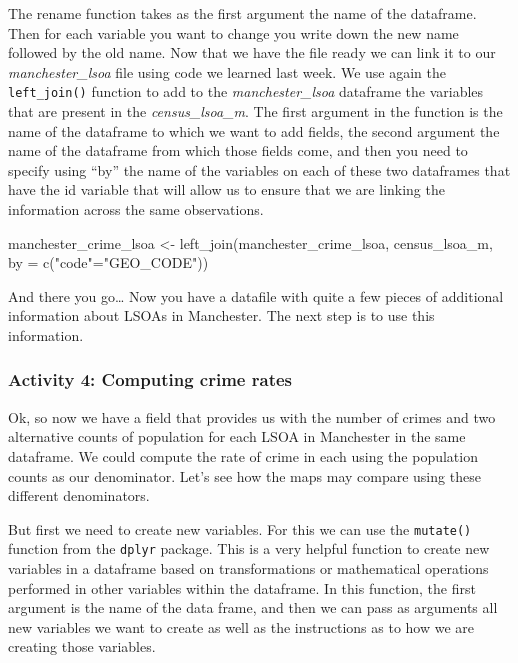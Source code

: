 \documentclass[
]{book}
\newenvironment{Shaded}{\begin{snugshade}}{\end{snugshade}}
\newcommand{\AttributeTok}[1]{\textcolor[rgb]{0.77,0.63,0.00}{#1}}
\newcommand{\FunctionTok}[1]{\textcolor[rgb]{0.00,0.00,0.00}{#1}}
\newcommand{\NormalTok}[1]{#1}
\newcommand{\OtherTok}[1]{\textcolor[rgb]{0.56,0.35,0.01}{#1}}
\newcommand{\StringTok}[1]{\textcolor[rgb]{0.31,0.60,0.02}{#1}}
\begin{document}
The rename function takes as the first argument the name of the dataframe. Then for each variable you want to change you write down the new name followed by the old name. Now that we have the file ready we can link it to our \emph{manchester\_lsoa} file using code we learned last week. We use again the \texttt{left\_join()} function to add to the \emph{manchester\_lsoa} dataframe the variables that are present in the \emph{census\_lsoa\_m}. The first argument in the function is the name of the dataframe to which we want to add fields, the second argument the name of the dataframe from which those fields come, and then you need to specify using ``by'' the name of the variables on each of these two dataframes that have the id variable that will allow us to ensure that we are linking the information across the same observations.

\begin{Shaded}
\begin{Highlighting}[]
\NormalTok{manchester\_crime\_lsoa }\OtherTok{\textless{}{-}} \FunctionTok{left\_join}\NormalTok{(manchester\_crime\_lsoa, census\_lsoa\_m, }\AttributeTok{by =} \FunctionTok{c}\NormalTok{(}\StringTok{"code"}\OtherTok{=}\StringTok{"GEO\_CODE"}\NormalTok{))}
\end{Highlighting}
\end{Shaded}

And there you go\ldots{} Now you have a datafile with quite a few pieces of additional information about LSOAs in Manchester. The next step is to use this information.

\hypertarget{activity-4-computing-crime-rates}{%
\subsubsection{Activity 4: Computing crime rates}\label{activity-4-computing-crime-rates}}

Ok, so now we have a field that provides us with the number of crimes and two alternative counts of population for each LSOA in Manchester in the same dataframe. We could compute the rate of crime in each using the population counts as our denominator. Let's see how the maps may compare using these different denominators.

But first we need to create new variables. For this we can use the \texttt{mutate()} function from the \texttt{dplyr} package. This is a very helpful function to create new variables in a dataframe based on transformations or mathematical operations performed in other variables within the dataframe. In this function, the first argument is the name of the data frame, and then we can pass as arguments all new variables we want to create as well as the instructions as to how we are creating those variables.
\end{document}

